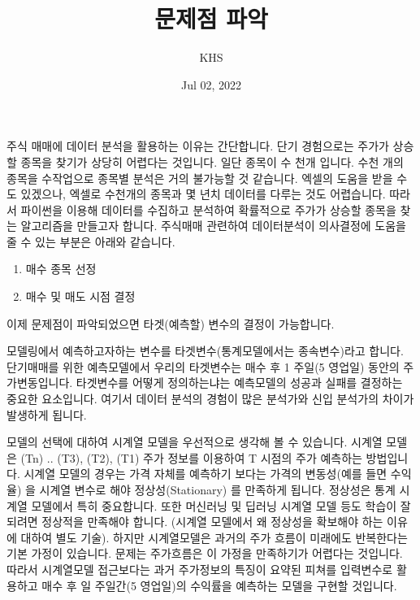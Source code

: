 \documentclass[letterpaper,10pt,english]{jupyterBook}
\title{문제점 파악}
\date{Jul 02, 2022}
\author{KHS}
\begin{document}
\pagestyle{empty}
\sphinxmaketitle
\pagestyle{plain}
\sphinxtableofcontents
\pagestyle{normal}
\label{\detokenize{chapter4/4.1.0_My_Strategy::doc}}


\sphinxAtStartPar
주식 매매에 데이터 분석을 활용하는 이유는 간단합니다. 단기 경험으로는 주가가 상승할 종목을 찾기가 상당히 어렵다는 것입니다. 일단 종목이 수 천개 입니다. 수천 개의 종목을 수작업으로 종목별 분석은 거의 불가능할 것 같습니다. 엑셀의 도움을 받을 수 도 있겠으나, 엑셀로 수천개의 종목과 몇 년치 데이터를 다루는 것도 어렵습니다.  따라서 파이썬을 이용해 데이터를 수집하고 분석하여 확률적으로 주가가 상승할 종목을 찾는 알고리즘을 만들고자 합니다. 주식매매 관련하여 데이터분석이 의사결정에 도움을 줄 수 있는 부분은 아래와 같습니다.
\begin{enumerate}
%
\item {} 
\sphinxAtStartPar
매수 종목 선정

\item {} 
\sphinxAtStartPar
매수 및 매도 시점 결정

\end{enumerate}



\sphinxAtStartPar
이제 문제점이 파악되었으면 타겟(예측할) 변수의 결정이 가능합니다.

\sphinxAtStartPar
모델링에서 예측하고자하는 변수를 타겟변수(통계모델에서는 종속변수)라고 합니다. 단기매매를 위한 예측모델에서 우리의 타겟변수는 매수 후 1 주일(5 영업일) 동안의 주가변동입니다. 타겟변수를 어떻게 정의하는냐는 예측모델의 성공과 실패를 결정하는 중요한 요소입니다. 여기서 데이터 분석의 경험이 많은 분석가와 신입 분석가의 차이가 발생하게 됩니다.

\sphinxAtStartPar
모델의 선택에 대하여 시계열 모델을 우선적으로 생각해 볼 수 있습니다. 시계열 모델은 (T\sphinxhyphen{}n) .. (T\sphinxhyphen{}3), (T\sphinxhyphen{}2), (T\sphinxhyphen{}1) 주가 정보를 이용하여 T 시점의 주가 예측하는 방법입니다. 시계열 모델의 경우는 가격 자체를 예측하기 보다는 가격의 변동성(예를 들면 수익율) 을 시계열 변수로 해야 정상성(Stationary) 를 만족하게 됩니다. 정상성은 통계 시계열 모델에서 특히 중요합니다. 또한 머신러닝 및 딥러닝 시계열 모델 등도 학습이 잘 되려면 정상적을 만족해야 합니다. (시계열 모델에서 왜 정상성을 확보해야 하는 이유에 대하여 별도 기술). 하지만 시계열모델은 과거의 주가 흐름이 미래에도 반복한다는 기본 가정이 있습니다.  문제는 주가흐름은 이 가정을 만족하기가 어렵다는 것입니다.  따라서 시계열모델 접근보다는 과거 주가정보의 특징이 요약된 피쳐를 입력변수로 활용하고 매수 후 일 주일간(5 영업일)의 수익률을 예측하는 모델을 구현할 것입니다.​
\end{document}
